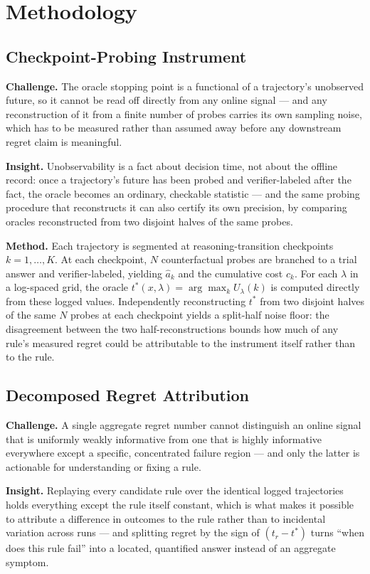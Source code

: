 \documentclass[11pt]{article}
\begin{document}
\section{Methodology}

\subsection{Checkpoint-Probing Instrument}
\textbf{Challenge.} The oracle stopping point is a functional of a trajectory's unobserved future, so it cannot be read off directly from any online signal --- and any reconstruction of it from a finite number of probes carries its own sampling noise, which has to be measured rather than assumed away before any downstream regret claim is meaningful.

\textbf{Insight.} Unobservability is a fact about decision time, not about the offline record: once a trajectory's future has been probed and verifier-labeled after the fact, the oracle becomes an ordinary, checkable statistic --- and the same probing procedure that reconstructs it can also certify its own precision, by comparing oracles reconstructed from two disjoint halves of the same probes.

\textbf{Method.} Each trajectory is segmented at reasoning-transition checkpoints $k = 1, \dots, K$. At each checkpoint, $N$ counterfactual probes are branched to a trial answer and verifier-labeled, yielding $\hat{a}_k$ and the cumulative cost $c_k$. For each $\lambda$ in a log-spaced grid, the oracle $t^*(x, \lambda) = \arg\max_k U_\lambda(k)$ is computed directly from these logged values. Independently reconstructing $t^*$ from two disjoint halves of the same $N$ probes at each checkpoint yields a split-half noise floor: the disagreement between the two half-reconstructions bounds how much of any rule's measured regret could be attributable to the instrument itself rather than to the rule.

\subsection{Decomposed Regret Attribution}
\textbf{Challenge.} A single aggregate regret number cannot distinguish an online signal that is uniformly weakly informative from one that is highly informative everywhere except a specific, concentrated failure region --- and only the latter is actionable for understanding or fixing a rule.

\textbf{Insight.} Replaying every candidate rule over the identical logged trajectories holds everything except the rule itself constant, which is what makes it possible to attribute a difference in outcomes to the rule rather than to incidental variation across runs --- and splitting regret by the sign of $(t_r - t^*)$ turns ``when does this rule fail'' into a located, quantified answer instead of an aggregate symptom.
\end{document}
